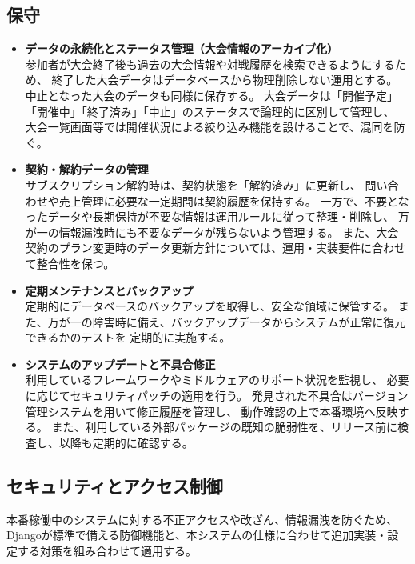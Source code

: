 \subsection{保守}
\begin{itemize}
    \item \textbf{データの永続化とステータス管理（大会情報のアーカイブ化）} \\
    参加者が大会終了後も過去の大会情報や対戦履歴を検索できるようにするため、
    終了した大会データはデータベースから物理削除しない運用とする。
    中止となった大会のデータも同様に保存する。
    大会データは「開催予定」「開催中」「終了済み」「中止」のステータスで論理的に区別して管理し、
    大会一覧画面等では開催状況による絞り込み機能を設けることで、混同を防ぐ。

    \item \textbf{契約・解約データの管理} \\
    サブスクリプション解約時は、契約状態を「解約済み」に更新し、
    問い合わせや売上管理に必要な一定期間は契約履歴を保持する。
    一方で、不要となったデータや長期保持が不要な情報は運用ルールに従って整理・削除し、
    万が一の情報漏洩時にも不要なデータが残らないよう管理する。
    また、大会契約のプラン変更時のデータ更新方針については、運用・実装要件に合わせて整合性を保つ。
    
    \item \textbf{定期メンテナンスとバックアップ} \\
    定期的にデータベースのバックアップを取得し、安全な領域に保管する。
    また、万が一の障害時に備え、バックアップデータからシステムが正常に復元できるかのテストを
    定期的に実施する。 
    
    \item \textbf{システムのアップデートと不具合修正} \\
    利用しているフレームワークやミドルウェアのサポート状況を監視し、
    必要に応じてセキュリティパッチの適用を行う。
    発見された不具合はバージョン管理システムを用いて修正履歴を管理し、
    動作確認の上で本番環境へ反映する。
    また、利用している外部パッケージの既知の脆弱性を、リリース前に検査し、以降も定期的に確認する。
\end{itemize}

\subsection{セキュリティとアクセス制御}

本番稼働中のシステムに対する不正アクセスや改ざん、情報漏洩を防ぐため、
Djangoが標準で備える防御機能と、本システムの仕様に合わせて追加実装・設定する対策を組み合わせて適用する。

